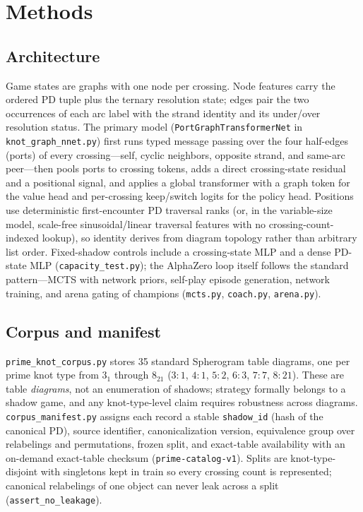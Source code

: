\section{Methods}
\label{sec:methods}

\subsection{Architecture}
\label{sec:architecture}

Game states are graphs with one node per crossing. Node features carry the
ordered PD tuple plus the ternary resolution state; edges pair the two
occurrences of each arc label with the strand identity and its under/over
resolution status. The primary model (\texttt{PortGraphTransformerNet} in
\texttt{knot\_graph\_nnet.py}) first runs typed message passing over the four
half-edges (ports) of every crossing---self, cyclic neighbors, opposite
strand, and same-arc peer---then pools ports to crossing tokens, adds a direct
crossing-state residual and a positional signal, and applies a global
transformer with a graph token for the value head and per-crossing keep/switch
logits for the policy head. Positions use deterministic first-encounter PD
traversal ranks (or, in the variable-size model, scale-free sinusoidal/linear
traversal features with no crossing-count-indexed lookup), so identity derives
from diagram topology rather than arbitrary list order. Fixed-shadow controls
include a crossing-state MLP and a dense PD-state MLP
(\texttt{capacity\_test.py}); the AlphaZero loop itself follows the standard
pattern---MCTS with network priors, self-play episode generation, network
training, and arena gating of champions (\texttt{mcts.py}, \texttt{coach.py},
\texttt{arena.py}).

\subsection{Corpus and manifest}
\label{sec:corpus}

\texttt{prime\_knot\_corpus.py} stores 35 standard Spherogram table diagrams,
one per prime knot type from $3_1$ through $8_{21}$ ($3{:}1$, $4{:}1$, $5{:}2$,
$6{:}3$, $7{:}7$, $8{:}21$). These are table \emph{diagrams}, not an
enumeration of shadows; strategy formally belongs to a shadow game, and any
knot-type-level claim requires robustness across diagrams.
\texttt{corpus\_manifest.py} assigns each record a stable \texttt{shadow\_id}
(hash of the canonical PD), source identifier, canonicalization version,
equivalence group over relabelings and permutations, frozen split, and
exact-table availability with an on-demand exact-table checksum
(\texttt{prime-catalog-v1}). Splits are knot-type-disjoint with singletons kept
in train so every crossing count is represented; canonical relabelings of one
object can never leak across a split (\texttt{assert\_no\_leakage}).

